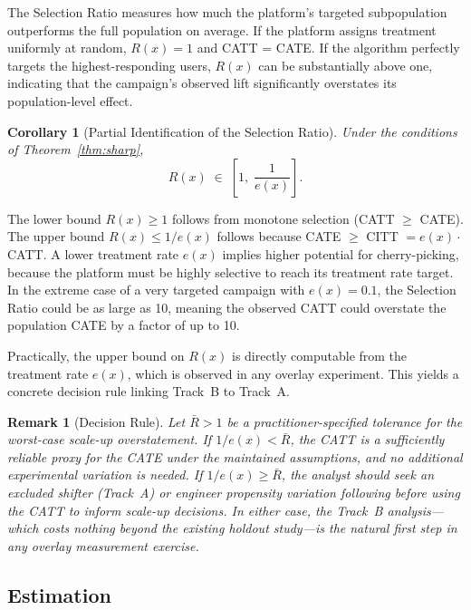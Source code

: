 \documentclass[11pt]{article}
\newtheorem{remark}{Remark}
\newtheorem{corollary}{Corollary}
\begin{document}
The Selection Ratio measures how much the platform's targeted subpopulation
outperforms the full population on average.  If the platform assigns treatment
uniformly at random, $R(x) = 1$ and CATT = CATE.  If the algorithm perfectly
targets the highest-responding users, $R(x)$ can be substantially above one,
indicating that the campaign's observed lift significantly overstates its
population-level effect.

\begin{corollary}[Partial Identification of the Selection Ratio]
\label{cor:ratio}
Under the conditions of Theorem~\ref{thm:sharp},
\begin{equation}
  R(x) \;\in\; \left[1,\;\frac{1}{e(x)}\right].
  \label{eq:ratio_bounds}
\end{equation}
\end{corollary}

The lower bound $R(x) \geq 1$ follows from monotone selection (CATT $\geq$
CATE).  The upper bound $R(x) \leq 1/e(x)$ follows because CATE $\geq$ CITT $=
e(x)\cdot$CATT.  A lower treatment rate $e(x)$ implies higher potential for
cherry-picking, because the platform must be highly selective to reach its
treatment rate target.  In the extreme case of a very targeted campaign with
$e(x) = 0.1$, the Selection Ratio could be as large as 10, meaning the observed
CATT could overstate the population CATE by a factor of up to 10.

Practically, the upper bound on $R(x)$ is directly computable from the treatment
rate $e(x)$, which is observed in any overlay experiment.  This yields a
concrete decision rule linking Track~B to Track~A.

\begin{remark}[Decision Rule]
\label{rem:decision}
Let $\bar{R} > 1$ be a practitioner-specified tolerance for the worst-case
scale-up overstatement.  If $1/e(x) < \bar{R}$, the CATT is a sufficiently
reliable proxy for the CATE under the maintained assumptions, and no additional
experimental variation is needed.  If $1/e(x) \geq \bar{R}$, the analyst should
seek an excluded shifter (Track~A) or engineer propensity variation following
\citet{waisman2025multicell} before using the CATT to inform scale-up decisions.
In either case, the Track~B analysis---which costs nothing beyond the existing
holdout study---is the natural first step in any overlay measurement exercise.
\end{remark}

\subsection{Estimation}
\label{subsec:estimation}
\end{document}
